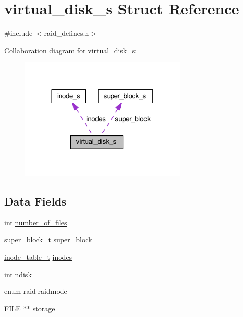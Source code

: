 \hypertarget{structvirtual__disk__s}{}\section{virtual\+\_\+disk\+\_\+s Struct Reference}
\label{structvirtual__disk__s}


{\ttfamily \#include $<$raid\+\_\+defines.\+h$>$}



Collaboration diagram for virtual\+\_\+disk\+\_\+s\+:
\nopagebreak
\begin{figure}[H]
\begin{center}
\leavevmode
\includegraphics[width=228pt]{structvirtual__disk__s__coll__graph}
\end{center}
\end{figure}
\subsection*{Data Fields}
\begin{DoxyCompactItemize}
\item 
int \hyperlink{structvirtual__disk__s_a465d502eed9840aad6ec9f3a5a5d844c}{number\+\_\+of\+\_\+files}
\item 
\hyperlink{raid__defines_8h_a5b2244b463782d93e6dfc058790cb9eb}{super\+\_\+block\+\_\+t} \hyperlink{structvirtual__disk__s_a32d9616143f7763451383a6c626038ca}{super\+\_\+block}
\item 
\hyperlink{raid__defines_8h_a5521b19dad3852291fc7d603382e6b99}{inode\+\_\+table\+\_\+t} \hyperlink{structvirtual__disk__s_a1bcc97bff109cd0065249a564a71d5c8}{inodes}
\item 
int \hyperlink{structvirtual__disk__s_a879b20de8088f4342835d5fb3feb1141}{ndisk}
\item 
enum \hyperlink{raid__defines_8h_a7a2279e0841d50aa8e976d3bb0eb3a6e}{raid} \hyperlink{structvirtual__disk__s_a207dd070642dde7ad48f8bb8b622f893}{raidmode}
\item 
F\+I\+LE $\ast$$\ast$ \hyperlink{structvirtual__disk__s_abed1c5c15dd8f784e7198b79f8973863}{storage}
\end{DoxyCompactItemize}


